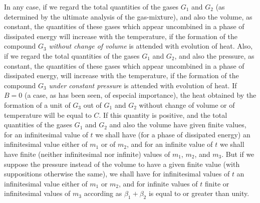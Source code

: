 \documentclass[12pt]{memoir}
\begin{document}
In any case, if we regard the total quantities of the gases $G_1$  and $G_2$ (as determined by the ultimate analysis of the gas-mixture), and also the volume, as constant, the quantities of these gases which appear uncombined in a phase of dissipated energy will increase with the temperature, if the formation of the compound $G_3$ \textit{without change of volume} is attended with evolution of heat.  Also, if we regard the total quantities of the gases $G_1$ and $G_2$, and also the pressure, as constant, the quantities of these gases which appear uncombined in a phase of dissipated energy, will increase with the temperature, if the formation of the compound $G_3$ \textit{under constant pressure} is attended with evolution of heat.  If $B=0$ (a case, as has been seen, of especial importance), the heat obtained by the formation of a unit of $G_3$ out of $G_1$  and $G_2$ without change of volume or of temperature will be equal to $C$. If this quantity is positive, and the total quantities of the gases $G_1$  and $G_2$ and also the volume have given finite values, for an infinitesimal value of $t$ we shall have (for a phase of dissipated energy) an infinitesimal value either of $m_1$ or of $m_2$, and for an infinite value of $t$ we shall have finite (neither infinitesimal nor infinite) values of $m_1$, $m_2$, and $m_3$. But if we suppose the pressure instead of the volume to have a given finite value (with suppositions otherwise the same), we shall have for infinitesimal values of $t$ an infinitesimal value either of $m_1$ or $m_2$, and for infinite values of $t$ finite or infinitesimal values of $m_3$ according as $\beta_1+\beta_2$ is equal to or greater than unity.
\end{document}
